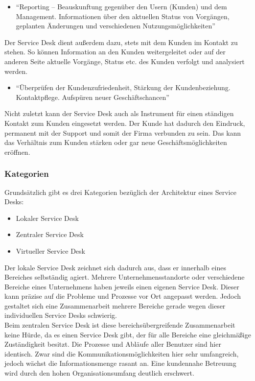 \begin{itemize}
\item \enquote{Reporting – Beauskunftung gegenüber den Usern (Kunden)
und dem Management. Informationen über den aktuellen
Status von Vorgängen, geplanten Änderungen und
verschiedenen Nutzungsmöglichkeiten}
\end{itemize}
\noindent
Der Service Desk dient außerdem dazu, stets mit dem Kunden im Kontakt zu stehen. So können Information an den Kunden weitergeleitet oder auf der anderen Seite aktuelle Vorgänge, Status etc. des Kunden verfolgt und analysiert werden. 

\begin{itemize}
\item \enquote{Überprüfen der Kundenzufriedenheit, Stärkung der Kundenbeziehung.
Kontaktpflege. Aufspüren neuer Geschäftschancen}
\end{itemize}
\noindent
Nicht zuletzt kann der Service Desk auch als Instrument für einen ständigen Kontakt zum Kunden eingesetzt werden. Der Kunde hat dadurch den Eindruck, permanent mit der Support und somit der Firma verbunden zu sein. Das kann das Verhältnis zum Kunden stärken oder gar neue Geschäftsmöglichkeiten eröffnen.\\


\subsubsection{Kategorien}

\noindent
Grundsätzlich gibt es drei Kategorien bezüglich der Architektur eines Service Desks:

\begin{itemize}
\item Lokaler Service Desk
\item Zentraler Service Desk
\item Virtueller Service Desk
\end{itemize}

\noindent
Der lokale Service Desk zeichnet sich dadurch aus, dass er innerhalb eines Bereiches selbständig agiert. Mehrere Unternehmensstandorte oder verschiedene Bereiche eines Unternehmens haben jeweils einen eigenen Service Desk. Dieser kann präzise auf die Probleme und Prozesse vor Ort angepasst werden. Jedoch gestaltet sich eine Zusammenarbeit mehrere Bereiche gerade wegen dieser individuellen Service Desks schwierig. \\

\noindent
Beim zentralen Service Desk ist diese bereichsübergreifende Zusammenarbeit keine Hürde, da es einen Service Desk gibt, der für alle Bereiche eine gleichmäßige Zuständigkeit besitzt. Die Prozesse und Abläufe aller Benutzer sind hier identisch. Zwar sind die Kommunikationsmöglichkeiten hier sehr umfangreich, jedoch wächst die Informationsmenge rasant an. Eine kundennahe Betreuung wird durch den hohen Organisationsumfang deutlich erschwert. \\

